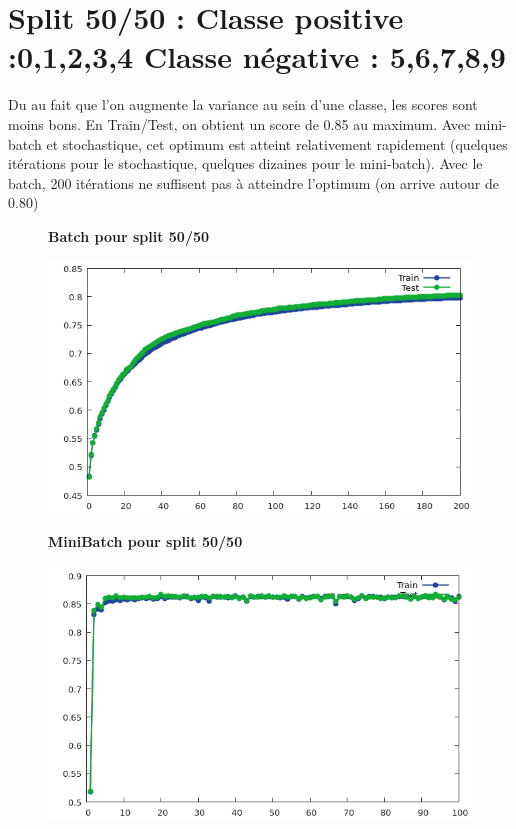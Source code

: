 \documentclass[a4paper]{article}
\begin{document}
\section{Split 50/50 : Classe positive :0,1,2,3,4 \newline Classe négative : 5,6,7,8,9}


Du au fait que l'on augmente la variance au sein d'une classe, les scores sont moins bons. En Train/Test, on obtient un score de 0.85 au maximum.\newline
Avec mini-batch et stochastique, cet optimum est atteint relativement rapidement (quelques itérations pour le stochastique, quelques dizaines pour le mini-batch).\newline
Avec le batch, 200 itérations ne suffisent pas à atteindre l'optimum (on arrive autour de 0.80)



\begin{figure}
  \centering
  \textbf{Batch pour split 50/50}\par\medskip
  \includegraphics[scale=0.55]{splitBatch50.png}
\end{figure}

\begin{figure}
  \centering
  \textbf{MiniBatch pour split 50/50}\par\medskip
  \includegraphics[scale=0.55]{splitMiniBatch50.png}
\end{figure}
\end{document}
